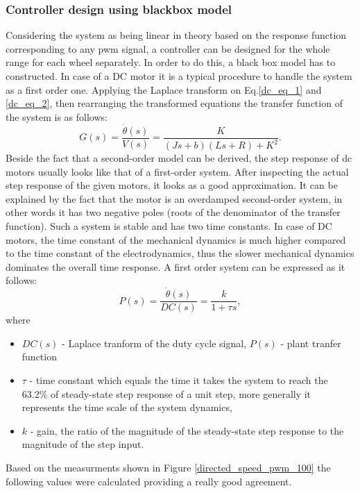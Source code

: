 \documentclass[12pt,english,twoside]{article}
\begin{document}
\subsubsection{Controller design using blackbox model}
Considering the system as being linear in theory based on the response function corresponding to any pwm signal, a controller can be designed for the whole range for each wheel separately. In order to do this, a black box model has to constructed. In case of a DC motor it is a typical procedure to handle the system as a first order one. \cite{dc_motor_3} 
Applying the Laplace transform on Eq.\ref{dc_eq_1} and \ref{dc_eq_2}, then rearranging the transformed equations the transfer function of the system is as follows:
\begin{equation}
G(s) = \frac{\dot \theta (s)}{V(s)} = \frac{K}{(Js+b)(Ls+R)+K^2}.
\end{equation} 
Beside the fact that a second-order model can be derived, the step response of dc motors usually looks like that of a first-order system. After inspecting the actual step response of the given motors, it looks as a good approximation. It can be explained by the fact that the motor is an overdamped second-order system, in other words it has two negative poles (roots of the denominator of the transfer function). Such a system is stable and has two time constants. In case of DC motors, the time constant of the mechanical dynamics is much higher compared to the time constant of the electrodynamics, thus the slower mechanical dynamics dominates the overall time response. 
A first order system can be expressed as it follows:
\begin{equation}
P(s) = \frac{\dot{\theta}(s)}{DC(s)}= \frac{k}{1+\tau s},
\end{equation}
where
\begin{itemize}
	\item $DC(s)$ - Laplace tranform of the duty cycle signal, $P(s)$ - plant tranfer function
	\item $\tau$ - time constant which equals the time it takes the system to reach the 63.2\% of steady-state step response of a unit step, more generally it represents the time scale of the system dynamics,
	\item $k$ - gain, the ratio of the magnitude of the steady-state step response to the magnitude of the step input.
\end{itemize}
Based on the measurments shown in Figure \ref{directed_speed_pwm_100} the following values were calculated providing a really good agreement.
\end{document}
